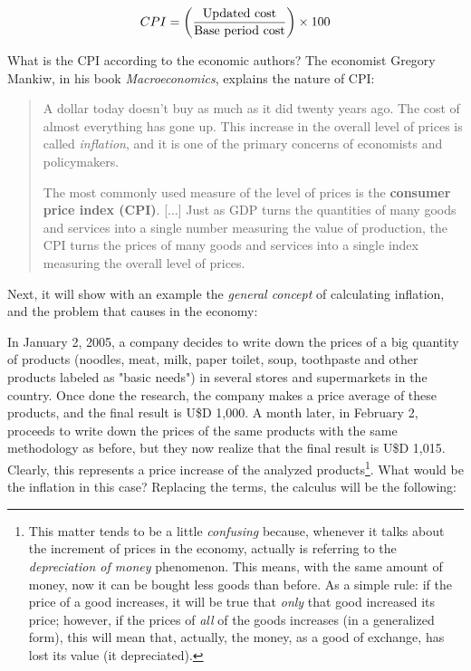\documentclass[12pt,a4paper,twoside]{book}
\begin{document}
\begin{equation}
CPI = \left( \dfrac{\text{Updated cost}}{\text{Base period cost}} \right) \times 100 \\
\end{equation}

What is the CPI according to the economic authors? The economist Gregory Mankiw, in his book \textit{Macroeconomics}, explains the nature of CPI:

\begin{quotation}
A dollar today doesn't buy as much as it did twenty years ago. The cost of almost everything has gone up. This increase in the overall level of prices is called \textit{inflation}, and it is one of the primary concerns of economists and policymakers.

The most commonly used measure of the level of prices is the \textbf{consumer price index (CPI)}. [...] Just as GDP turns the quantities of many goods and services into a single number measuring the value of production, the CPI turns the prices of many goods and services into a single index measuring the overall level of prices. \cite[p. 32]{mankiw:macroeconomics}
\end{quotation}

Next, it will show with an example the \textit{general concept} of calculating inflation, and the problem that causes in the economy:

In January 2, 2005, a company decides to write down the prices of a big quantity of products (noodles, meat, milk, paper toilet, soup, toothpaste and other products labeled as "basic needs") in several stores and supermarkets in the country. Once done the research, the company makes a price average of these products, and the final result is U\$D 1,000. A month later, in February 2, proceeds to write down the prices of the same products with the same methodology as before, but they now realize that the final result is U\$D 1,015. Clearly, this represents a price increase of the analyzed products\footnote{This matter tends to be a little \textit{confusing} because, whenever it talks about the increment of prices in the economy, actually is referring to the \textit{depreciation of money} phenomenon. This means, with the same amount of money, now it can be bought less goods than before. As a simple rule: if the price of a good increases, it will be true that \textit{only} that good increased its price; however, if the prices of \textit{all} of the goods increases (in a generalized form), this will mean that, actually, the money, as a good of exchange, has lost its value (it depreciated).}. What would be the inflation in this case? Replacing the terms, the calculus will be the following:
\end{document}

